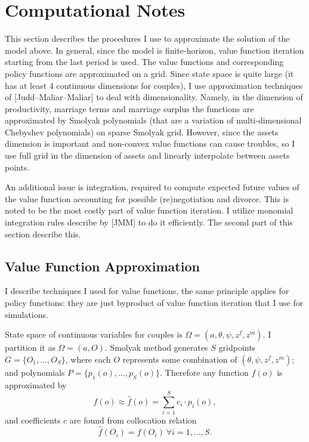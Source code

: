 \section{Computational Notes}
This section describes the procedures I use to approximate the solution of the model above. In general, since the model is finite-horizon, value function iteration starting from the last period is used. The value functions and corresponding policy functions are approximated on a grid. Since state space is quite large (it has at least 4 continuous dimensions for couples), I use approximation techniques of [Judd--Maliar--Maliar] to deal with dimensionality. Namely, in the dimension of productivity, marriage terms and marriage surplus the functions are approximated by Smolyak polynomials (that are a variation of multi-dimensional Chebyshev polynomials) on sparse Smolyak grid. However, since the assets dimension is important and non-convex value functions can cause troubles, so I use full grid in the dimension of assets and linearly interpolate between assets points.

An additional issue is integration, required to compute expected future values of the value function accounting for possible (re)negotiation and divorce. This is noted to be the most costly part of value function iteration. I utilize monomial integration rules describe by [JMM] to do it efficiently. The second part of this section describe this. 

\subsection{Value Function Approximation}
I describe techniques I used for value functions, the same principle applies for policy functions: they are just byproduct of value function iteration that I use for simulations.

State space of continuous variables for couples is $\Omega = (a,\theta,\psi,z^f,z^m)$. I partition it as $\Omega = (a,O)$. Smolyak method generates $S$ gridpoints $G = \{O_1,...,O_S\}$, where each $O$ represents some combination of $(\theta,\psi,z^f,z^m)$; and polynomials $P = \{p_1(o),...,p_S(o)\}$. Therefore any function $f(o)$ is approximated by
\[f(o) \approx \hat{f}(o) = \sum_{i=1}^S c_{i}\cdot p_i(o),\]
and coefficients $c$ are found from collocation relation
\[\hat{f}(O_i) = f(O_i) \ \forall i = 1,...,S.\]

